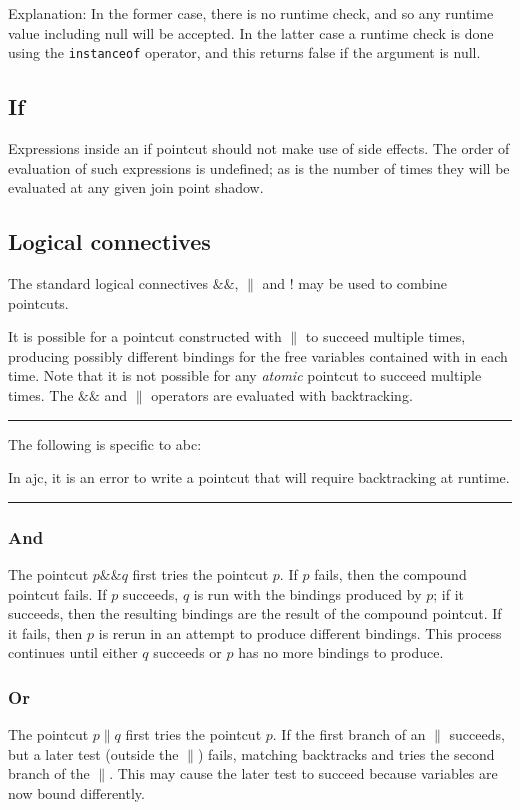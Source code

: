 \documentclass[12pt,a4paper]{report}
\newcommand\abcdistinctionbegin[0]{%
\hrule
\noindent
The following is specific to abc:

\noindent
}
\newcommand\abcdistinctionend[0]{%
\hrule
}
\def\ajand{\&\!\!\&}
\def\ajor{\|}
\def\ajnot{!}
\begin{document}
Explanation: In the former case, there is no runtime check, and so any
runtime value including null will be accepted. In the latter case a runtime
check is done using the \verb|instanceof| operator, and this returns false
if the argument is null.


\subsection{If}
Expressions inside an if pointcut should not make use of side effects. 
The order of evaluation of such expressions is undefined; as is the number
of times they will be evaluated at any given join point shadow.

\subsection{Logical connectives}

The standard logical connectives $\ajand$, $\ajor$ and $\ajnot$
may be used to combine pointcuts. 

It is possible for a pointcut
constructed with $\ajor$ to succeed multiple times, producing possibly 
different bindings for the free variables contained with in each time.
Note that it is not possible for any {\em atomic} pointcut to succeed
multiple times. The $\ajand$ and $\ajor$ operators are evaluated with
backtracking.

\abcdistinctionbegin
In ajc, it is an error to write a pointcut that will require backtracking
at runtime.
\abcdistinctionend

\subsubsection{And}

The pointcut $p\ajand q$ first tries the pointcut $p$. If $p$ fails, then the
compound pointcut fails. If $p$ succeeds, $q$ is run with the bindings
produced by $p$; if it succeeds, then the resulting bindings are the 
result of the compound pointcut. If it fails, then $p$ is rerun in an attempt
to produce different bindings. This process continues until either $q$
succeeds or $p$ has no more bindings to produce.

\subsubsection{Or}

The pointcut $p\ajor q$ first tries the pointcut $p$.
If the first branch of an $\ajor$ succeeds, but a later test (outside 
the $\ajor$) fails,
matching backtracks and tries the second branch of the $\ajor$. This may
cause the later test to succeed because variables are now bound differently.
\end{document}
